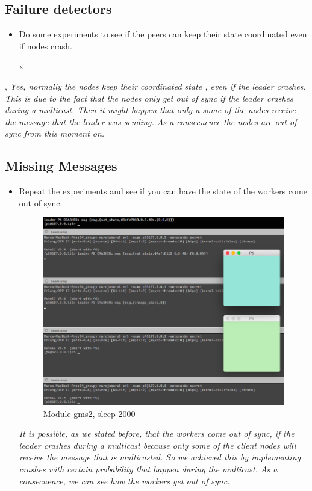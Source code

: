 \subsection{Failure detectors}
\begin{itemize}
\item Do some experiments to see if the peers can keep their state coordinated even if nodes crash.

x

\end{itemize}, 
\newline\textit{Yes, normally the nodes keep their coordinated state , even if the leader crashes. This is due to the fact that the nodes only get out of sync if the leader crashes during a multicast. Then it might happen that only a some of the nodes receive the message that the leader was sending. As a consecuence the nodes are out of sync from this moment on.}

\clearpage
\subsection{Missing Messages}
\begin{itemize}
\item Repeat the experiments and see if you can have the state
of the workers come out of sync.
\begin{figure}[h!]
\centering
\includegraphics[scale=0.4]{resources/img/exp3.png}
\caption{Module gms2, sleep 2000}
\end{figure}
\newline\textit{It is possible, as we stated before, that the workers come out of sync, if the leader crashes during a multicast because only some of the client nodes will receive the message that is multicasted. So we achieved this by implementing crashes with certain probability that happen during the multicast. As a consecuence, we can see how the workers get out of sync.}

\end{itemize}

